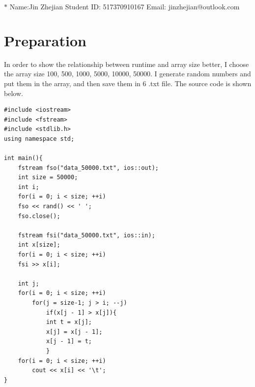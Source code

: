\documentclass[12pt,a4paper]{article}
\theoremstyle{definition}
\begin{document}
\noindent

\noindent{}
\begin{center}
	\footnotesize{\color{blue}$*$ Name:Jin Zhejian	\quad Student ID: 517370910167 \quad Email: jinzhejian@outlook.com}
\end{center}




\section{Preparation}
 In order to show the relationship between runtime and array size better, I choose the array size 100, 500, 1000, 5000, 10000, 50000. I  generate random numbers and put them in the array, and then save them in 6 .txt file. The source code is shown below.
 \begin{lstlisting}[caption={generate.cpp}]
#include <iostream>
#include <fstream>
#include <stdlib.h>
using namespace std;

int main(){
	fstream fso("data_50000.txt", ios::out);
	int size = 50000;
	int i;
	for(i = 0; i < size; ++i)
	fso << rand() << ' ';
	fso.close();

	fstream fsi("data_50000.txt", ios::in);
	int x[size];
	for(i = 0; i < size; ++i)
	fsi >> x[i];

	int j;
	for(i = 0; i < size; ++i)
		for(j = size-1; j > i; --j)
			if(x[j - 1] > x[j]){
			int t = x[j];
			x[j] = x[j - 1];
			x[j - 1] = t;
			}
	for(i = 0; i < size; ++i)
		cout << x[i] << '\t';
}
 \end{lstlisting}
\end{document}

